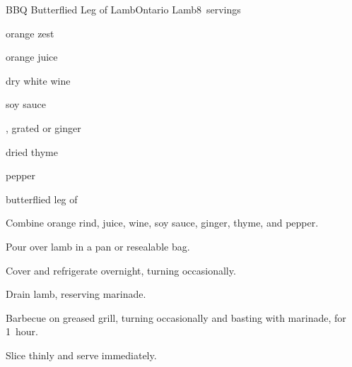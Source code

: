 \begin{recipe}{BBQ Butterflied Leg of Lamb}{Ontario Lamb}{8~servings}

\begin{ingredients}
\item {} orange zest
\item \C{\half} orange juice
\item \C{\half} dry white wine
\item \C{\quarter} soy sauce
\item {} , grated  or  ginger
\item {} dried thyme
\item \tp{\quarter} pepper
\item {} butterflied leg of 
\end{ingredients}

\begin{directions}
\item Combine orange rind, juice, wine, soy sauce, ginger, thyme, and pepper.
\item Pour over lamb in a pan or resealable bag.
\item Cover and refrigerate overnight, turning occasionally.
\item Drain lamb, reserving marinade.
\item Barbecue on greased grill, turning occasionally and basting with marinade, for 1~hour.
\item Slice thinly and serve immediately.
\end{directions}

\end{recipe}

